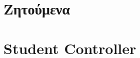 \documentclass[12pt]{article}
\begin{document}
\begin{titlepage}
		
		
		
		
		\vfill %
		
	\end{titlepage}
	
	
	
	\tableofcontents
	
	
	
	
	\newpage
	
	
	
	\section{Ζητούμενα}
	
	

	\section{Student Controller}
	
\end{document}
